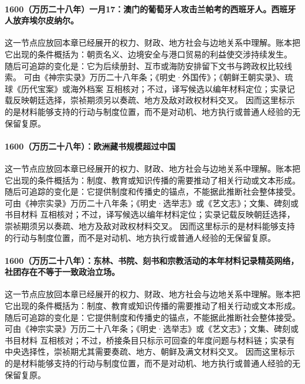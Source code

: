\paragraph{1600（万历二十八年）一月17：澳门的葡萄牙人攻击兰帕考的西班牙人。西班牙人放弃埃尔皮纳尔。} 这一节点应放回本章已经展开的权力、财政、地方社会与边地关系中理解。账本把它出现的条件概括为：朝贡名义、边境安全与港口贸易的利益使交涉持续发生。 随后可追踪的变化是：它为后续册封、互市或海防安排留下文书与跨政权比较线索。 可由《神宗实录》万历二十八年条；《明史·外国传》；《朝鲜王朝实录》、琉球《历代宝案》或海外档案 互相核对；不过，译写候选以编年材料定位；实录记载反映朝廷选择，崇祯期须另以奏疏、地方及敌对政权材料交叉。 因而这里标示的是材料能够支持的行动与制度位置，而不是对动机、地方执行或普通人经验的无保留复原。

\paragraph{1600（万历二十八年）：欧洲藏书规模超过中国} 这一节点应放回本章已经展开的权力、财政、地方社会与边地关系中理解。账本把它出现的条件概括为：制度、教育或知识传播的需要推动了相关行动或文本形成。 随后可追踪的变化是：它提供制度和传播史的锚点，不能据此推断社会整体接受。 可由《神宗实录》万历二十八年条；《明史·选举志》或《艺文志》；文集、碑刻或书目材料 互相核对；不过，译写候选以编年材料定位；实录记载反映朝廷选择，崇祯期须另以奏疏、地方及敌对政权材料交叉。 因而这里标示的是材料能够支持的行动与制度位置，而不是对动机、地方执行或普通人经验的无保留复原。

\paragraph{1600（万历二十八年）：东林、书院、刻书和宗教活动的本年材料记录精英网络，社团存在不等于一致政治立场。} 这一节点应放回本章已经展开的权力、财政、地方社会与边地关系中理解。账本把它出现的条件概括为：制度、教育或知识传播的需要推动了相关行动或文本形成。 随后可追踪的变化是：它提供制度和传播史的锚点，不能据此推断社会整体接受。 可由《神宗实录》万历二十八年条；《明史·选举志》或《艺文志》；文集、碑刻或书目材料 互相核对；不过，桥接条目只标示可回查的年度问题与材料链；实录有中央选择性，崇祯期尤其需要奏疏、地方、朝鲜及满文材料交叉。 因而这里标示的是材料能够支持的行动与制度位置，而不是对动机、地方执行或普通人经验的无保留复原。

